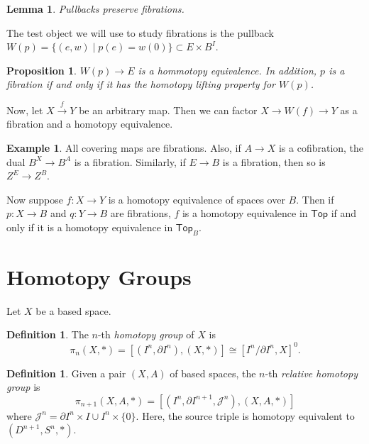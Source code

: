 \documentclass[leqno, openany]{memoir}
\newtheorem{prop}[thm]{Proposition}
\newtheorem{lem}[thm]{Lemma}
\theoremstyle{definition}
\newtheorem{defn}[thm]{Definition}
\newtheorem{exm}[thm]{Example}
\theoremstyle{remark}
\theoremstyle{plain}
\theoremstyle{definition}
\theoremstyle{remark}
\newcommand{\mc}[1]{\mathcal{#1}}
\newcommand{\ms}[1]{\mathsf{#1}}
\begin{document}
\begin{lem}
    Pullbacks preserve fibrations.
\end{lem}

The test object we will use to study fibrations is the pullback $W(p) = \{ (e,w) \mid p(e) = w(0) \} \subset E \times B^I$.

\begin{prop}
    $W(p) \to E$ is a hommotopy equivalence. In addition, $p$ is a fibration if and only if it has the homotopy lifting property for $W(p)$.
\end{prop}

Now, let $X \xrightarrow{f} Y$ be an arbitrary map. Then we can factor $X \to W(f) \to Y$ as a fibration and a homotopy equivalence.

\begin{exm}
    All covering maps are fibrations. Also, if $A \to X$ is a cofibration, the dual $B^X \to B^A$ is a fibration. Similarly, if $E \to B$ is a fibration, then so is $Z^E \to Z^B$.
\end{exm}

Now suppose $f \colon X \to Y$ is a homotopy equivalence of spaces over $B$. Then if $p \colon X \to B$ and $q \colon Y \to B$ are fibrations, $f$ is a homotopy equivalence in $\ms{Top}$ if and only if it is a homotopy equivalence in $\ms{Top}_B$.

\section{Homotopy Groups}%
\label{sec:homotopy_groups}

Let $X$ be a based space.

\begin{defn}
    The $n$-th \textit{homotopy group}  of $X$ is 
    \[ \pi_n(X,*) = [(I^n, \partial I^n), (X,*)] \cong [I^n / \partial I^n, X]^0. \]
\end{defn}

\begin{defn}
    Given a pair $(X,A)$ of based spaces, the $n$-th \textit{relative homotopy group} is
    \[ \pi_{n+1}(X,A,*) = [(I^n, \partial I^{n+1}, \mc{J}^n), (X, A, *)] \]
    where $\mc{J}^n = \partial I^n \times I \cup I^n \times \{0 \}$. Here, the source triple is homotopy equivalent to $(D^{n+1}, S^n, *)$.
\end{defn}
\end{document}

